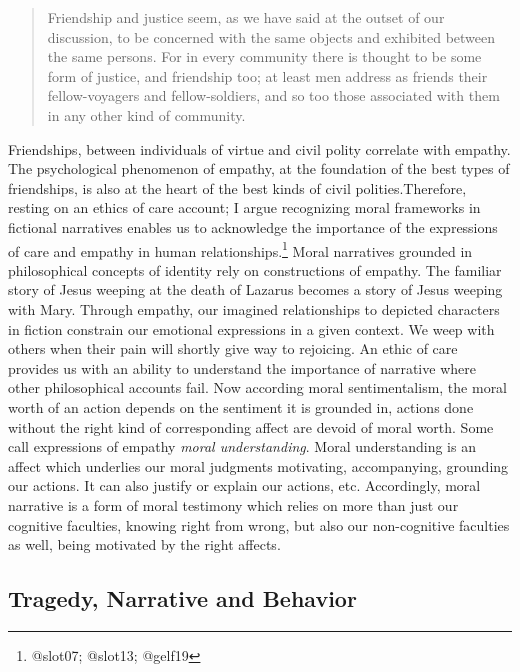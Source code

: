 \documentclass[
  letterpaper,
  DIV=11,
  numbers=noendperiod]{scrartcl}
\theoremstyle{remark}
\begin{document}
\begin{quote}
Friendship and justice seem, as we have said at the outset of our
discussion, to be concerned with the same objects and exhibited between
the same persons. For in every community there is thought to be some
form of justice, and friendship too; at least men address as friends
their fellow-voyagers and fellow-soldiers, and so too those associated
with them in any other kind of community.
\end{quote}

Friendships, between individuals of virtue and civil polity correlate
with empathy. The psychological phenomenon of empathy, at the foundation
of the best types of friendships, is also at the heart of the best kinds
of civil polities.Therefore, resting on an ethics of care account; I
argue recognizing moral frameworks in fictional narratives enables us to
acknowledge the importance of the expressions of care and empathy in
human relationships.\footnote{@slot07; @slot13; @gelf19} Moral
narratives grounded in philosophical concepts of identity rely on
constructions of empathy. The familiar story of Jesus weeping at the
death of Lazarus becomes a story of Jesus weeping with Mary. Through
empathy, our imagined relationships to depicted characters in fiction
constrain our emotional expressions in a given context. We weep with
others when their pain will shortly give way to rejoicing. An ethic of
care provides us with an ability to understand the importance of
narrative where other philosophical accounts fail. Now according moral
sentimentalism, the moral worth of an action depends on the sentiment it
is grounded in, actions done without the right kind of corresponding
affect are devoid of moral worth. Some call expressions of empathy
\emph{moral understanding}. Moral understanding is an affect which
underlies our moral judgments motivating, accompanying, grounding our
actions. It can also justify or explain our actions, etc. Accordingly,
moral narrative is a form of moral testimony which relies on more than
just our cognitive faculties, knowing right from wrong, but also our
non-cognitive faculties as well, being motivated by the right affects.

\subsection{Tragedy, Narrative and
Behavior}\label{tragedy-narrative-and-behavior}
\end{document}

